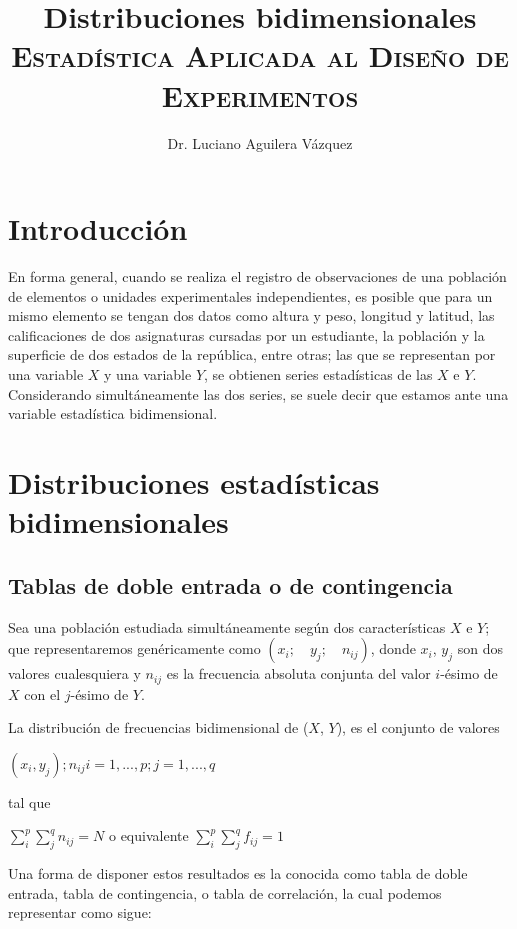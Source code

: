 \documentclass[11 pts, letterpaper, twosided]{article}
\title{Distribuciones bidimensionales\\
      {\normalsize \textsc{Estadística Aplicada al Diseño de Experimentos}}}
\author{Dr. Luciano Aguilera Vázquez}
\begin{document}
\maketitle

\section{Introducción}

En forma general, cuando se realiza el registro de observaciones de
una población de elementos o unidades experimentales independientes,
es posible que para un mismo elemento se tengan dos datos como altura
y peso, longitud y latitud, las calificaciones de dos asignaturas
cursadas por un estudiante, la población y la superficie de dos
estados de la república, entre otras; las que se representan por una
variable $X$ y una variable $Y$, se obtienen series estadísticas de
las $X$ e $Y$. Considerando simultáneamente las dos series, se suele
decir que estamos ante una variable estadística bidimensional.

\section[Dist. est. bidimensionales]{Distribuciones estadísticas bidimensionales}

\subsection{Tablas de doble entrada o de contingencia}

Sea una población estudiada simultáneamente según dos características
$X$ e $Y$; que representaremos genéricamente como
$(x_i;\quad y_j;\quad n_{ij})$, donde $x_i$, $y_j$ son dos valores
cualesquiera y $n_{ij}$ es la frecuencia absoluta conjunta del valor
$i$-ésimo de $X$ con el $j$-ésimo de $Y$.

La distribución de frecuencias bidimensional de ($X$, $Y$), es el
conjunto de valores

${(x_i, y_j); n_{ij}} i = 1, ..., p; j = 1, ..., q$

tal que

$\sum_i^p\sum_j^q n_{ij}= N$ o equivalente $\sum_i^p\sum_j^q f_{ij} = 1$

Una forma de disponer estos resultados es la conocida como tabla de
doble entrada, tabla de contingencia, o tabla de correlación, la cual
podemos representar como sigue:
\end{document}
